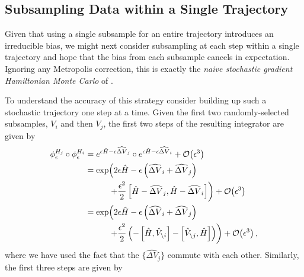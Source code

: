 \documentclass{article}
\begin{document}
\subsection{Subsampling Data within a Single Trajectory}

Given that using a single subsample for an entire trajectory introduces an
irreducible bias, we might next consider subsampling at each step within
a single trajectory and hope that the bias from each subsample cancels
in expectation.  Ignoring any Metropolis correction, this is exactly the
\textit{naive stochastic gradient Hamiltonian Monte Carlo} of \cite{ChenEtAl:2014}.

To understand the accuracy of this strategy consider building up such a 
stochastic trajectory one step at a time.  Given the first two randomly-selected 
subsamples, $V_{i}$ and then $V_{j}$, the first two steps of the resulting
integrator are given by
%
\begin{align*}
\phi^{H_{j}}_{\epsilon} \circ \phi^{H_{i}}_{\epsilon}
&=
e^{ \epsilon \hat{H} - \epsilon  \widehat{ \Delta V}_{j} } 
\circ e^{ \epsilon \hat{H} - \epsilon  \widehat{ \Delta V}_{i} }
+ \mathcal{O} \! \left( \epsilon^{3} \right)
\\
&=
\exp \! \left( 
2 \epsilon \hat{H} - \epsilon \left(  \widehat{ \Delta V}_{i} +  \widehat{ \Delta V}_{j} \right)
\right.
\\
& \hspace{10mm} \left.
+ \frac{\epsilon^{2}}{2} \left[ \hat{H} -  \widehat{ \Delta V}_{j}, \hat{H} - \widehat{ \Delta V}_{i} \right]
\right)
+ \mathcal{O} \! \left( \epsilon^{3} \right)
\\
&=
\exp \! \left( 
2 \epsilon \hat{H} - \epsilon \left( \widehat{ \Delta V}_{i} + \widehat{ \Delta V}_{j} \right)
\right.
\\
& \hspace{10mm} \left.
+ \frac{\epsilon^{2}}{2} \left(
- \left[ \hat{H}, \hat{V}_{\setminus i} \right]
- \left[ \hat{V}_{\setminus j}, \hat{H} \right] \right) \right)
+ \mathcal{O} \! \left( \epsilon^{3} \right),
\end{align*}
%
where we have used the fact that the $\{ \widehat{ \Delta V}_{j} \}$ commute
with each other.  Similarly, the first three steps are given by
%
\end{document}
